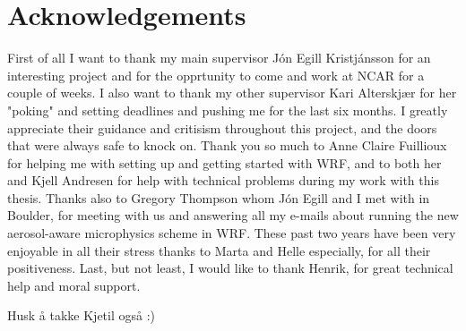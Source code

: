 \section*{Acknowledgements}

First of all I want to thank my main supervisor Jón Egill Kristjánsson for an interesting project and for the opprtunity to come and work at NCAR for a couple of weeks. I also want to thank my other supervisor Kari Alterskjær for her "poking" and setting deadlines and pushing me for the last six months. I greatly appreciate their guidance and critisism throughout this project, and the doors that were always safe to knock on. 
Thank you so much to Anne Claire Fuillioux for helping me with setting up and getting started with WRF, and to both her and Kjell Andresen for help with technical problems during my work with this thesis.
Thanks also to Gregory Thompson whom Jón Egill and I met with in Boulder, for meeting with us and answering all my e-mails about running the new aerosol-aware microphysics scheme in WRF.
These past two years have been very enjoyable in all their stress thanks to Marta and Helle especially, for all their positiveness.
Last, but not least, I would like to thank Henrik, for great technical help and moral support.

Husk å takke Kjetil også :)